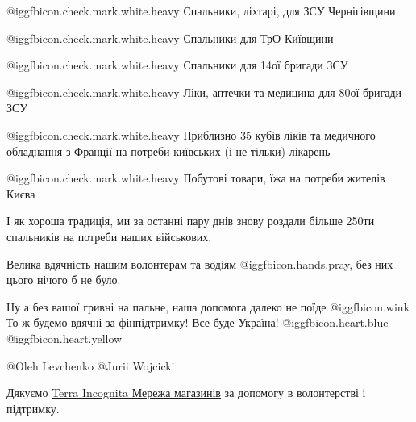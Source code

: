 @igg{fbicon.check.mark.white.heavy}  Спальники, ліхтарі, для ЗСУ Чернігівщини

@igg{fbicon.check.mark.white.heavy}  Спальники для ТрО Київщини 

@igg{fbicon.check.mark.white.heavy}  Спальники для 14ої бригади ЗСУ

@igg{fbicon.check.mark.white.heavy}  Ліки, аптечки та медицина для 80ої бригади
ЗСУ

@igg{fbicon.check.mark.white.heavy}  Приблизно 35 кубів ліків та медичного
обладнання з Франції на потреби київських (і не тільки) лікарень

@igg{fbicon.check.mark.white.heavy}  Побутові товари, їжа на потреби жителів Києва


І як хороша традиція, ми за останні пару днів знову роздали більше 250ти
спальників на потреби наших військових.

Велика вдячність нашим волонтерам та водіям @igg{fbicon.hands.pray}, без них цього нічого б не було.

Ну а без вашої гривні на пальне, наша допомога далеко не поїде @igg{fbicon.wink} То ж будемо
вдячні за фінпідтримку! Все буде Україна! @igg{fbicon.heart.blue}  @igg{fbicon.heart.yellow} 

@Oleh Levchenko @Jurii Wojcicki

Дякуємо \href{https://www.facebook.com/TerraIncognitaUA}{Terra Incognita Мережа
магазинів} за допомогу в волонтерстві і підтримку.

